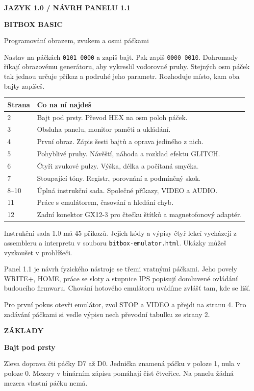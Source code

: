 \documentclass[11pt,a4paper]{article}
\newcommand{\tagline}[1]{{\sffamily\bfseries\color{accent}\small #1}\par}
\newcommand{\titleline}[1]{{\sffamily\bfseries\fontsize{25}{29}\selectfont #1\par}\vspace{2mm}}
\newcommand{\sub}[1]{\par\vspace{2mm}{\sffamily\bfseries\large #1\par}\nobreak}
\newcommand{\note}[1]{\par\vspace{2mm}\noindent\colorbox{pale}{\parbox{.96\linewidth}{\raggedright #1}}\par}
\begin{document}
\tagline{JAZYK 1.0  /  NÁVRH PANELU 1.1}
\titleline{BITBOX BASIC}
{\sffamily\Large Programování obrazem, zvukem a osmi páčkami}

Nastav na páčkách \texttt{0101 0000} a zapiš bajt. Pak zapiš \texttt{0000 0010}. Dohromady říkají obrazovému generátoru, aby vykreslil vodorovné pruhy. Stejných osm páček tak jednou určuje příkaz a podruhé jeho parametr. Rozhoduje místo, kam oba bajty zapíšeš.

\sub{Jak číst tuto příručku}
{\small\begin{tabularx}{\linewidth}{@{}lX@{}}\toprule
\textbf{Strana} & \textbf{Co na ní najdeš}\\\midrule
2 & Bajt pod prsty. Převod HEX na osm poloh páček.\\
3 & Obsluha panelu, monitor paměti a ukládání.\\
4 & První obraz. Zápis šesti bajtů a oprava jediného z nich.\\
5 & Pohyblivé pruhy. Návěští, náhoda a rozklad efektu GLITCH.\\
6 & Čtyři zvukové pulzy. Výška, délka a počítaná smyčka.\\
7 & Stoupající tóny. Registr, porovnání a podmíněný skok.\\
8--10 & Úplná instrukční sada. Společné příkazy, VIDEO a AUDIO.\\
11 & Práce s emulátorem, časování a hledání chyb.\\
12 & Zadní konektor GX12-3 pro čtečku štítků a magnetofonový adaptér.\\
\bottomrule\end{tabularx}}\par
\sub{Dvě verze na pracovním stole}
Instrukční sada 1.0 má 45 příkazů. Jejich kódy a výpisy čtyř lekcí vycházejí z assembleru a interpretu v souboru \texttt{bitbox-emulator.html}. Ukázky můžeš vyzkoušet v prohlížeči.

Panel 1.1 je návrh fyzického nástroje se třemi vratnými páčkami. Jeho povely WRITE+, HOME, práce se sloty a stupnice IPS popisují domluvené ovládání budoucího firmwaru. Chování hotového emulátoru uvádíme zvlášť tam, kde se liší.

\note{Pro první pokus otevři emulátor, zvol STOP a VIDEO a přejdi na stranu 4. Pro zadávání páčkami si vedle výpisu nech převodní tabulku ze strany 2.}
\clearpage
\tagline{ZÁKLADY}
\titleline{Bajt pod prsty}
Zleva doprava čti páčky D7 až D0. Jednička znamená páčku v poloze 1, nula v poloze 0. Mezery v binárním zápisu pomáhají číst čtveřice. Na panelu žádná mezera vlastní páčku nemá.
\end{document}
